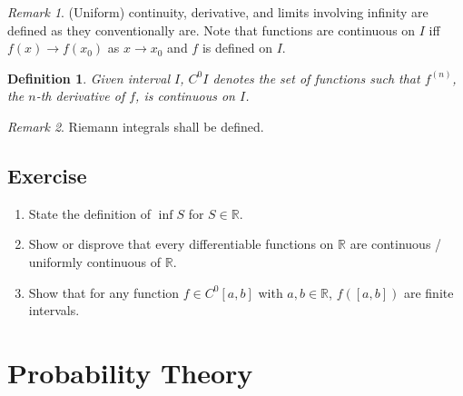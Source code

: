 \documentclass{book}
\newtheorem{definition}{Definition}
\theoremstyle{definition}\newtheorem{mechanism}{Mechanism}
\theoremstyle{remark}\newtheorem*{remark}{Remark}
\begin{document}
\begin{remark}
	(Uniform) continuity, derivative, and limits involving infinity are defined as they conventionally are. Note that functions are continuous on $I$ iff $f(x)\to f(x_0)$ as $x\to x_0$ and $f$ is defined on $I$.
\end{remark}

\begin{definition}
	Given interval $I$, $C^0I$ denotes the set of functions such that $f^{(n)}$, the $n$-th derivative of $f$, is continuous on $I$.
\end{definition}

\begin{remark}
	Riemann integrals shall be defined.
\end{remark}

\subsection*{Exercise}

\begin{enumerate}
	\item State the definition of $\inf S$ for $S\in \mathbb R$.
	\item Show or disprove that every differentiable functions on $\mathbb R$ are continuous / uniformly continuous of $\mathbb R$.
	\item Show that for any function $f\in C^0[a, b]$ with $a, b\in \mathbb R$, $f([a, b])$ are finite intervals.
\end{enumerate}

\section{Probability Theory}
\end{document}

